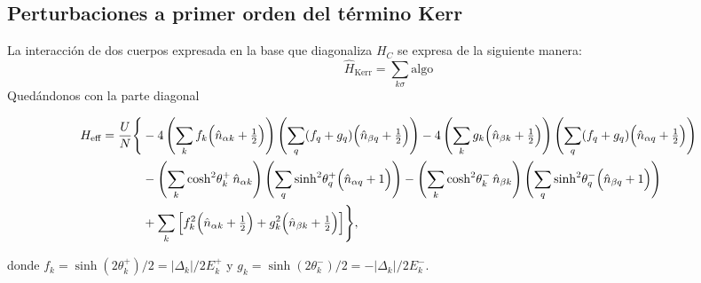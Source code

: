 \subsection{Perturbaciones a primer orden del término Kerr}
La interacción de dos cuerpos expresada en la base que diagonaliza $H_C$ se expresa de la siguiente manera:
\begin{equation}
  \hat H_{\text{Kerr}} = \sum_{k\sigma} \text{algo}
\end{equation}
Quedándonos con la parte diagonal
\begin{widetext}
\begin{equation}
\begin{aligned}
H_\text{eff} = \frac{U}{N} \Biggl\{
&-4\left(\sum_k f_k\Bigl(\hat{n}_{\alpha k}+\tfrac{1}{2}\Bigr)\right)
  \left(\sum_q (f_q+g_q)\Bigl(\hat{n}_{\beta q}+\tfrac{1}{2}\Bigr)\right)
-4\left(\sum_k g_k\Bigl(\hat{n}_{\beta k}+\tfrac{1}{2}\Bigr)\right)
  \left(\sum_q (f_q+g_q)\Bigl(\hat{n}_{\alpha q}+\tfrac{1}{2}\Bigr)\right)
\\
&-\left(\sum_k \cosh^2\!\theta^+_k\,\hat{n}_{\alpha k}\right)
  \left(\sum_q \sinh^2\!\theta^+_q\Bigl(\hat{n}_{\alpha q}+1\Bigr)\right)
-\left(\sum_k \cosh^2\!\theta^-_k\,\hat{n}_{\beta k}\right)
  \left(\sum_q \sinh^2\!\theta^-_q\Bigl(\hat{n}_{\beta q}+1\Bigr)\right)
\\
&+\sum_k\left[f_k^2\Bigl(\hat{n}_{\alpha k}+\tfrac{1}{2}\Bigr)
  + g_k^2\Bigl(\hat{n}_{\beta k}+\tfrac{1}{2}\Bigr)\right]
\Biggr\},
\end{aligned}
\label{eq:Heff}
\end{equation}
\end{widetext}
donde $f_k = \sinh(2\theta^+_k)/2 = |\Delta_k|/2E^+_k$ y
$g_k = \sinh(2\theta^-_k)/2 = -|\Delta_k|/2E^-_k$.